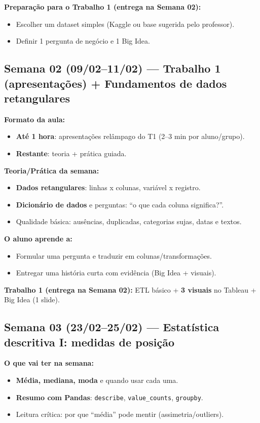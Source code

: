\begin{SolvedBox}
\textbf{Preparação para o Trabalho 1 (entrega na Semana 02):}
\begin{itemize}[leftmargin=*]
  \item Escolher um dataset simples (Kaggle ou base sugerida pelo professor).
  \item Definir 1 pergunta de negócio e 1 Big Idea.
\end{itemize}
\end{SolvedBox}

\subsection*{Semana 02 (09/02--11/02) --- Trabalho 1 (apresentações) + Fundamentos de dados retangulares}
\textbf{Formato da aula:}
\begin{itemize}[leftmargin=*]
  \item \textbf{Até 1 hora}: apresentações relâmpago do T1 (2--3 min por aluno/grupo).
  \item \textbf{Restante}: teoria + prática guiada.
\end{itemize}

\textbf{Teoria/Prática da semana:}
\begin{itemize}[leftmargin=*]
  \item \textbf{Dados retangulares}: linhas x colunas, variável x registro.
  \item \textbf{Dicionário de dados} e perguntas: ``o que cada coluna significa?''.
  \item Qualidade básica: ausências, duplicadas, categorias sujas, datas e textos.
\end{itemize}

\textbf{O aluno aprende a:}
\begin{itemize}[leftmargin=*]
  \item Formular uma pergunta e traduzir em colunas/transformações.
  \item Entregar uma história curta com evidência (Big Idea + visuais).
\end{itemize}

\begin{SolvedBox}
\textbf{Trabalho 1 (entrega na Semana 02):} ETL básico + \textbf{3 visuais} no Tableau + Big Idea (1 slide).
\end{SolvedBox}

\subsection*{Semana 03 (23/02--25/02) --- Estatística descritiva I: medidas de posição}
\textbf{O que vai ter na semana:}
\begin{itemize}[leftmargin=*]
  \item \textbf{Média, mediana, moda} e quando usar cada uma.
  \item \textbf{Resumo com Pandas}: \texttt{describe}, \texttt{value\_counts}, \texttt{groupby}.
  \item Leitura crítica: por que ``média'' pode mentir (assimetria/outliers).
\end{itemize}

